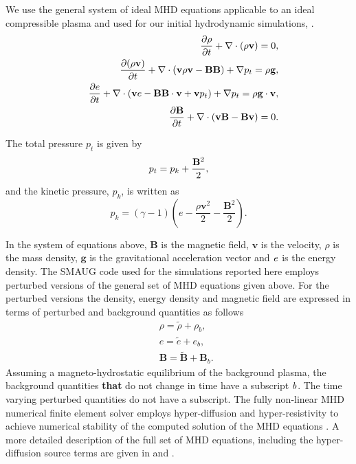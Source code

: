 \documentclass[physics,article,submit,pdftex,moreauthors]{Definitions/mdpi}
\begin{document}
We use the 
general system of ideal MHD equations applicable to an ideal compressible plasma and used for our initial hydrodynamic simulations, \citet{Griffiths2018b}.
\begin{eqnarray}
&& {{\partial \rho}\over{\partial t}}+\nabla\cdot\left( \rho{\mathbf v}\right)=0, \label{e1} \\
&& {{\partial ( \rho {\bf v})}\over{\partial t}}+\nabla\cdot\left( {\bf v}\rho {\bf v}-{\bf B B}\right)+\nabla p_t=\rho{\bf g}, \label{e2}\\
&& \frac{\partial e}{\partial t}+\nabla\cdot\left({\bf v}e-{\bf B B}\cdot{\bf v}+{\bf v}p_{t}\right)+\nabla p_t=\rho{\bf g}\cdot{\bf v}, \label{e3} \\
&& {{\partial{\bf B}}\over{\partial t}} +\nabla \cdot\left(  {\bf vB}-{\bf Bv}\right)=0. \label{e4}
\end{eqnarray}

\noindent
The total pressure $p_{t}$ is given by
\begin{equation}
p_{t}=p_{k}+{{\bf B}^{2}\over{2}}, \label{e5}
\end{equation}
and the kinetic pressure, $p_k$, is written as
\begin{equation}
p_{k}=\left(\gamma -1\right)\left(e-\frac{\rho {\mathbf v}^{2}}{2}-\frac{{\mathbf B}^{2}}{2}\right). \label{e6}
\end{equation}

In the system of equations above,  $\mathbf B$ is the magnetic field, $\mathbf v$ is the velocity, $\rho$ is the mass density, $\mathbf g$ is the gravitational acceleration vector  and  $\it{e}$ is the energy density. The SMAUG code used for the simulations reported here employs perturbed versions of the general set of MHD equations given above. For the perturbed versions the density,  energy density and magnetic field are expressed in terms of perturbed and background quantities as follows
\begin{eqnarray}
&& \rho = \tilde{\rho}+\rho_b, \nonumber \\
&& e = \tilde{e}+e_b,  \nonumber \\
&& {\mathbf B} = \tilde{\mathbf B}+{\mathbf B}_b.  \nonumber 
\end{eqnarray}
Assuming a magneto-hydrostatic equilibrium of the background plasma, the background quantities {\bf that} do not change in time have a subscript $\it{b}$. The time varying perturbed quantities do not have a subscript. The fully non-linear MHD numerical finite element solver employs hyper-diffusion and hyper-resistivity to achieve numerical stability of the computed solution of the MHD equations \citet{Caunt2001}. A more detailed description of the full set of MHD equations, including the hyper-diffusion source terms are given in \citet{Griffiths2015} and \citet{Shelyag2008}.
\end{document}
